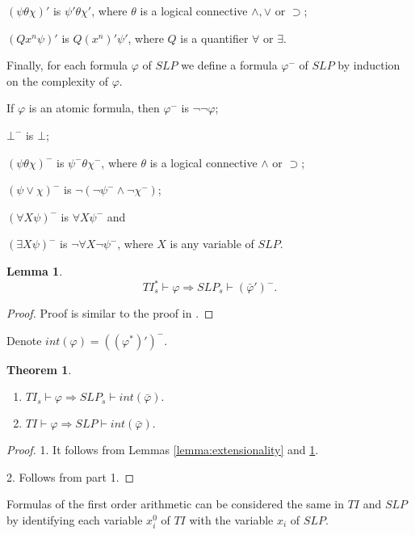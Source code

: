 \documentclass{asl}
\newtheorem{theorem}{Theorem}[section]
\newtheorem{lemma}{Lemma}[section]
\theoremstyle{definition}
\begin{document}
$(\psi\theta\chi)'$ is $\psi'\theta\chi'$, where $\theta$ is a logical connective $\wedge,\vee$ or $\supset$;
\medskip

$(Qx^n\psi)'$ is $Q(x^n)'\psi'$, where $Q$ is a quantifier $\forall$ or $\exists$.

Finally, for each formula $\varphi$ of $SLP$ we define a formula $\varphi^-$ of $SLP$ by induction on the complexity of $\varphi$.

If $\varphi$ is an atomic formula, then $\varphi^-$ is $\neg\neg\varphi$;

$\bot^-$ is $\bot$;
\smallskip

$(\psi\theta\chi)^-$ is $\psi^-\theta\chi^-$, where $\theta$ is a logical connective $\wedge$ or $\supset$;
\medskip

$(\psi\vee\chi)^-$ is $ \neg(\neg\psi^-\wedge\neg\chi^-)$;
\medskip

$(\forall X\psi)^-$ is $\forall X\psi^-$ and 
\medskip

$(\exists X\psi)^-$ is $\neg\forall X\neg\psi^-$, 
where $X$ is any variable of $SLP$.

\begin{lemma}
\[TI_s^*\vdash \varphi \Rightarrow SLP_s\vdash (\bar{\varphi}')^{-}.\] \label{lemma:int0}
\end{lemma}
\begin{proof}
Proof is similar to the proof in \cite{kash89}.
\end{proof}

Denote $int(\varphi)=((\varphi^*)')^-$. 

\begin{theorem}
\begin{enumerate}
\item $TI_s\vdash \varphi \Rightarrow SLP_s\vdash int(\bar{\varphi}).$
\item $TI\vdash \varphi \Rightarrow SLP\vdash int(\bar{\varphi}).$
\end{enumerate}

\label{theorem:int}
\end{theorem}
\begin{proof}
1. It follows from Lemmas \ref{lemma:extensionality} and \ref{lemma:int0}.

2. Follows from part 1.
\end{proof}

Formulas of the first order arithmetic can be considered the same in $TI$ and $SLP$ by identifying each variable $x_i^0$ of $TI$ with the variable $x_i$ of $SLP$.
\end{document}
